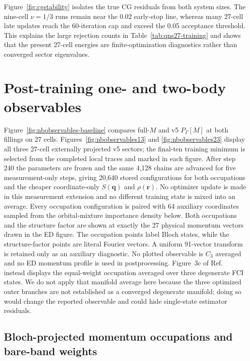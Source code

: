 Figure~\ref{fig:cgstability} isolates the true CG residuals from both system
sizes.  The nine-cell $\nu=1/3$ runs remain near the 0.02 early-stop line,
whereas many 27-cell late updates reach the 60-iteration cap and exceed the
0.05 acceptance threshold.  This explains the large rejection counts in
Table~\ref{tab:qns27-training} and shows that the present 27-cell energies are
finite-optimization diagnostics rather than converged sector eigenvalues.

\section{Post-training one- and two-body observables}

Figure~\ref{fig:nbobservables-baseline} compares full-$M$ and v5
$P_\Gamma[M]$ at both fillings on 27 cells. Figures~\ref{fig:nbobservables13}
and \ref{fig:nbobservables23} display all three 27-cell externally projected
v5 sectors; the final-ten training minimum is selected from the completed
local traces and marked in each figure. After step 240 the parameters are
frozen and the same 4,128 chains are advanced for five measurement-only steps,
giving 20,640 stored configurations for both occupations and the cheaper
coordinate-only $S(\bm q)$ and $\rho(\bm r)$. No optimizer update is made in
this measurement extension and no different training state is mixed into an
average. Every occupation configuration is paired with 64 auxiliary
coordinates sampled from the orbital-mixture importance density below.
Both occupations and the structure factor are shown at exactly the 27 physical
momentum vectors drawn in the ED figure. The occupation points label Bloch
states, while the structure-factor points are literal Fourier vectors. A
uniform 91-vector transform is retained only as an auxiliary diagnostic.
No plotted observable is $C_3$ averaged and no ED momentum profile is used in
postprocessing.  Figure~3c of Ref.~\cite{limomentum} instead displays the
equal-weight occupation averaged over three degenerate FCI states.  We do not
apply that manifold average here because the three optimized outer branches
are not established as a converged degenerate manifold; doing so would change
the reported observable and could hide single-state estimator residuals.

\subsection{Bloch-projected momentum occupations and bare-band weights}

